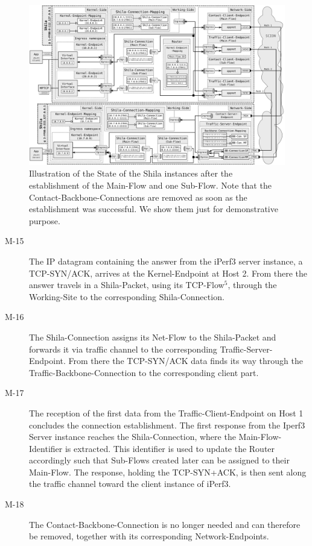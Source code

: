 	\begin{landscape}
		\begin{figure}
			\begin{center}
				\def\svgwidth{1\textwidth}
				\includegraphics[scale=0.2]{../illustrations/implementation/ConnectionEstablishment.pdf}   
				\caption[Caption for the list of figures.]{Illustration of the State of the Shila instances after the establishment of the Main-Flow and one Sub-Flow. Note that the Contact-Backbone-Connections are removed as soon as the establishment was successful. We show them just for demonstrative purpose.}
				\label{fig:ConnectionEstablishment}
			\end{center}
		\end{figure}
	\end{landscape}
\begin{description}		
	\item[M-15] The IP datagram containing the answer from the iPerf3 server instance, a TCP-SYN/ACK, arrives at the Kernel-Endpoint at Host 2. From there the answer travels in a Shila-Packet, using its TCP-Flow$^{5}$, through the Working-Site to the corresponding Shila-Connection.
	\item[M-16] The Shila-Connection assigns its Net-Flow to the Shila-Packet and forwards it via traffic channel to the corresponding Traffic-Server-Endpoint. From there the TCP-SYN/ACK data finds its way through the Traffic-Backbone-Connection to the corresponding client part. 
	\item[M-17] The reception of the first data from the Traffic-Client-Endpoint on Host 1 concludes the connection establishment. The first response from the Iperf3 Server instance reaches the Shila-Connection, where the Main-Flow-Identifier is extracted. This identifier is used to update the Router accordingly such that Sub-Flows created later can be assigned to their Main-Flow. The response, holding the TCP-SYN+ACK, is then sent along the traffic channel toward the client instance of iPerf3.
	\item[M-18] The Contact-Backbone-Connection is no longer needed and can therefore be removed, together with its corresponding Network-Endpoints.
\end{description}

